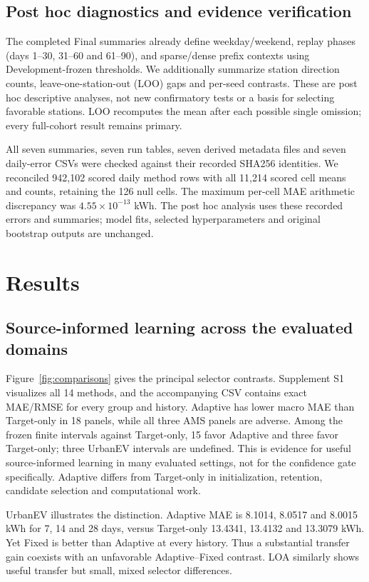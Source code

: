 \documentclass[pdflatex,iicol,sn-mathphys-num]{sn-jnl}
\begin{document}
\subsection{Post hoc diagnostics and evidence verification}
The completed Final summaries already define weekday/weekend, replay phases (days 1--30, 31--60 and 61--90), and sparse/dense prefix contexts using Development-frozen thresholds. We additionally summarize station direction counts, leave-one-station-out (LOO) gaps and per-seed contrasts. These are post hoc descriptive analyses, not new confirmatory tests or a basis for selecting favorable stations. LOO recomputes the mean after each possible single omission; every full-cohort result remains primary.

All seven summaries, seven run tables, seven derived metadata files and seven daily-error CSVs were checked against their recorded SHA256 identities. We reconciled 942,102 scored daily method rows with all 11,214 scored cell means and counts, retaining the 126 null cells. The maximum per-cell MAE arithmetic discrepancy was $4.55\times10^{-13}$ kWh. The post hoc analysis uses these recorded errors and summaries; model fits, selected hyperparameters and original bootstrap outputs are unchanged.

\section{Results}\label{sec:results}
\subsection{Source-informed learning across the evaluated domains}\label{sec:transfer}

Figure~\ref{fig:comparisons} gives the principal selector contrasts. Supplement S1 visualizes all 14 methods, and the accompanying CSV contains exact MAE/RMSE for every group and history. Adaptive has lower macro MAE than Target-only in 18 panels, while all three AMS panels are adverse. Among the frozen finite intervals against Target-only, 15 favor Adaptive and three favor Target-only; three UrbanEV intervals are undefined. This is evidence for useful source-informed learning in many evaluated settings, not for the confidence gate specifically. Adaptive differs from Target-only in initialization, retention, candidate selection and computational work.

UrbanEV illustrates the distinction. Adaptive MAE is 8.1014, 8.0517 and 8.0015 kWh for 7, 14 and 28 days, versus Target-only 13.4341, 13.4132 and 13.3079 kWh. Yet Fixed is better than Adaptive at every history. Thus a substantial transfer gain coexists with an unfavorable Adaptive--Fixed contrast. LOA similarly shows useful transfer but small, mixed selector differences.
\end{document}
